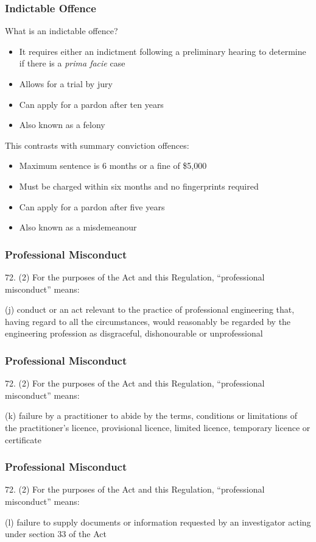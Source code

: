 \begin{frame}
\frametitle{Indictable Offence}

What is an indictable offence?
\begin{itemize}
\item It requires either an indictment following a preliminary hearing to determine if there is a \textit{prima facie} case
\item Allows for a trial by jury
\item Can apply for a pardon after ten years
\item Also known as a felony
\end{itemize}


This contrasts with summary conviction offences:
\begin{itemize}
	\item Maximum sentence is 6 months or a fine of \$5,000
	\item Must be charged within six months and no fingerprints required
	\item Can apply for a pardon after five years
	\item Also known as a misdemeanour
\end{itemize}


\end{frame}


\begin{frame}
\frametitle{Professional Misconduct}

72. (2) For the purposes of the Act and this Regulation, ``professional misconduct'' means:

(j) conduct or an act relevant to the practice of professional 	engineering that, having regard to all the circumstances, would 	reasonably be regarded by the engineering profession as 	disgraceful, dishonourable or unprofessional

\end{frame}


\begin{frame}
\frametitle{Professional Misconduct}

72. (2) For the purposes of the Act and this Regulation, ``professional misconduct'' means:

(k) failure by a practitioner to abide by the terms, conditions or 	limitations of the practitioner's licence, provisional licence, 	limited licence, temporary licence or certificate

\end{frame}


\begin{frame}
\frametitle{Professional Misconduct}

72. (2) For the purposes of the Act and this Regulation, ``professional misconduct'' means:

(l)  failure to supply documents or information requested by an 	investigator acting under section 33 of the Act

\end{frame}



